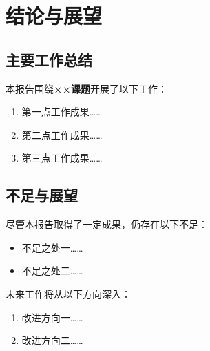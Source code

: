 
\chapter{结论与展望}

\section{主要工作总结}

本报告围绕\textbf{××课题}开展了以下工作：

\begin{enumerate}
    \item 第一点工作成果……
    \item 第二点工作成果……
    \item 第三点工作成果……
\end{enumerate}

\section{不足与展望}

尽管本报告取得了一定成果，仍存在以下不足：

\begin{itemize}
    \item 不足之处一……
    \item 不足之处二……
\end{itemize}

未来工作将从以下方向深入：

\begin{enumerate}
    \item 改进方向一……
    \item 改进方向二……
\end{enumerate}
